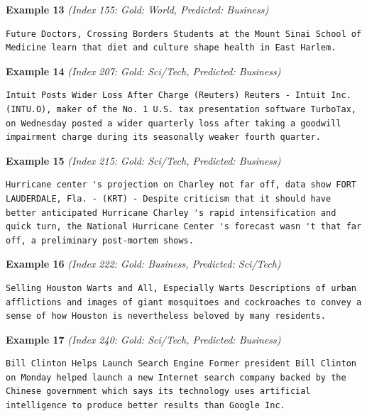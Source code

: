\noindent
\textbf{Example 13} \quad \textit{(Index 155: Gold: World, Predicted: Business)}

\begin{Verbatim}[breaklines=true,breakanywhere=true,fontsize=\small]
Future Doctors, Crossing Borders Students at the Mount Sinai School of Medicine learn that diet and culture shape health in East Harlem.
\end{Verbatim}

\noindent
\textbf{Example 14} \quad \textit{(Index 207: Gold: Sci/Tech, Predicted: Business)}

\begin{Verbatim}[breaklines=true,breakanywhere=true,fontsize=\small]
Intuit Posts Wider Loss After Charge (Reuters) Reuters - Intuit Inc. (INTU.O), maker of the No. 1 U.S. tax presentation software TurboTax, on Wednesday posted a wider quarterly loss after taking a goodwill impairment charge during its seasonally weaker fourth quarter.
\end{Verbatim}

\noindent
\textbf{Example 15} \quad \textit{(Index 215: Gold: Sci/Tech, Predicted: Business)}

\begin{Verbatim}[breaklines=true,breakanywhere=true,fontsize=\small]
Hurricane center 's projection on Charley not far off, data show FORT LAUDERDALE, Fla. - (KRT) - Despite criticism that it should have better anticipated Hurricane Charley 's rapid intensification and quick turn, the National Hurricane Center 's forecast wasn 't that far off, a preliminary post-mortem shows.
\end{Verbatim}

\noindent
\textbf{Example 16} \quad \textit{(Index 222: Gold: Business, Predicted: Sci/Tech)}

\begin{Verbatim}[breaklines=true,breakanywhere=true,fontsize=\small]
Selling Houston Warts and All, Especially Warts Descriptions of urban afflictions and images of giant mosquitoes and cockroaches to convey a sense of how Houston is nevertheless beloved by many residents.
\end{Verbatim}

\noindent
\textbf{Example 17} \quad \textit{(Index 240: Gold: Sci/Tech, Predicted: Business)}

\begin{Verbatim}[breaklines=true,breakanywhere=true,fontsize=\small]
Bill Clinton Helps Launch Search Engine Former president Bill Clinton on Monday helped launch a new Internet search company backed by the Chinese government which says its technology uses artificial intelligence to produce better results than Google Inc.
\end{Verbatim}

